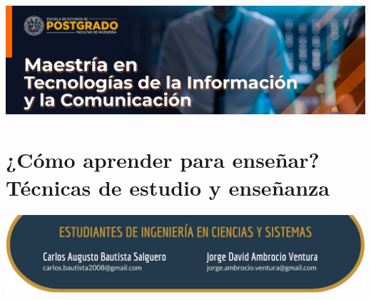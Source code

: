 \documentclass[12pt,spanish,Letterpaper,openany]{book}
\begin{document}
\begin{center}\includegraphics[width=1\linewidth]{images/publicidad13} \end{center}

\hypertarget{pareja34}{%
\chapter{¿Cómo aprender para enseñar? Técnicas de estudio y enseñanza}\label{pareja34}}

\begin{center}\includegraphics[width=1\linewidth]{images/pareja34_image1} \end{center}
\end{document}
